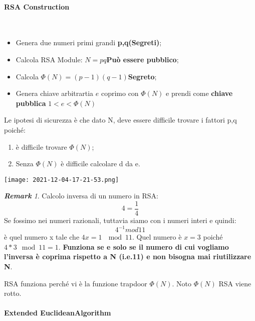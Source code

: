 \documentclass{article}
\theoremstyle{remark}
\newtheorem*{remark}{\textbf{Remark}}
\begin{document}
\paragraph{RSA Construction}\mbox{}\\
\begin{itemize}
	\item Genera due numeri primi grandi \textbf{p,q(Segreti)};
	\item Calcola RSA Module: \(N=pq\)\textbf{Può essere pubblico};
	\item Calcola \(\Phi(N)=(p-1)(q-1)\)\textbf{Segreto};
	\item Genera chiave arbitrartia \(e\) coprimo con \(\Phi(N)\) e prendi come \textbf{chiave pubblica} \(1<e<\Phi(N)\)
\end{itemize}
Le ipotesi di sicurezza è che dato N, deve essere difficile trovare i fattori p,q poiché:\begin{enumerate}
	\item è difficile trovare \(\Phi(N)\);
	\item Senza \(\Phi(N)\) è difficile calcolare d da e.
\end{enumerate}
\begin{center}
	\texttt{[image: 2021-12-04-17-21-53.png]}
\end{center}
\begin{remark}
	Calcolo inversa di un numero in RSA:
	\begin{equation}
		4=\frac{1}{4}
	\end{equation}
	Se fossimo nei numeri razionali, tuttavia siamo con i numeri interi e quindi:
	\begin{equation}
		4^{-1}mod 11
	\end{equation}
	è quel numero x tale che \(4x=1\ \mod{11}\).\newline
	Quel numero è \(x=3\) poiché \(4*3 \mod{11}=1\). \newline
	\textbf{Funziona se e solo se il numero di cui vogliamo l'inversa è coprima rispetto a N (i.e.11) e non bisogna mai riutilizzare N}.
\end{remark}
RSA funziona perché vi è la funzione trapdoor \(\Phi(N)\). Noto \(\Phi(N)\) RSA viene rotto.
\paragraph{Extended EuclideanAlgorithm}\mbox{}\\
\end{document}
